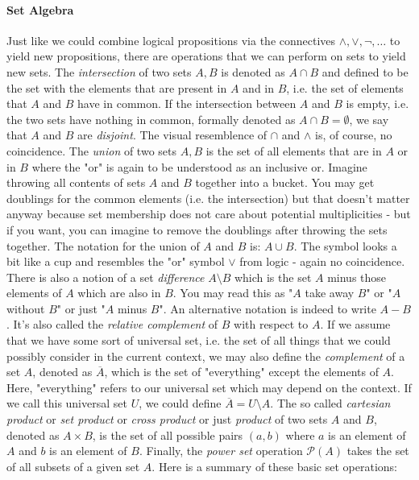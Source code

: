 \paragraph{Set Algebra} \label{Par:SetAlgebra} Just like we could combine logical propositions via the connectives $\wedge, \vee, \neg, \ldots$ to yield new propositions, there are operations that we can perform on sets to yield new sets. The \emph{intersection} of two sets $A, B$ is denoted as $A \cap B$ and defined to be the set with the elements that are present in $A$ and in $B$, i.e. the set of elements that $A$ and $B$ have in common. If the intersection between $A$ and $B$ is empty, i.e. the two sets have nothing in common, formally denoted as $A \cap B = \emptyset$, we say that $A$ and $B$ are \emph{disjoint}. The visual resemblence of $\cap$ and $\wedge$ is, of course, no coincidence. The \emph{union} of two sets $A,B$ is the set of all elements that are in $A$ or in $B$ where the "or" is again to be understood as an inclusive or. Imagine throwing all contents of sets $A$ and $B$ together into a bucket. You may get doublings for the common elements (i.e. the intersection) but that doesn't matter anyway because set membership does not care about potential multiplicities - but if you want, you can imagine to remove the doublings after throwing the sets together. The notation for the union of $A$ and $B$ is: $A \cup B$. The symbol looks a bit like a cup and resembles the "or" symbol $\vee$ from logic - again no coincidence. There is also a notion of a set \emph{difference} $A \setminus B$ which is the set $A$ minus those elements of $A$ which are also in $B$. You may read this as "$A$ take away $B$" or "$A$ without $B$" or just "$A$ minus $B$". An alternative notation is indeed to write $A - B$. It's also called the \emph{relative complement} of $B$ with respect to $A$. If we assume that we have some sort of universal set, i.e. the set of all things that we could possibly consider in the current context, we may also define the \emph{complement} of a set $A$, denoted as $\overline{A}$, which is the set of "everything" except the elements of $A$. Here, "everything" refers to our universal set which may depend on the context. If we call this universal set $U$, we could define $\overline{A} = U \setminus A$. The so called \emph{cartesian product} or \emph{set product} or \emph{cross product} or just \emph{product} of two sets $A$ and $B$, denoted as $A \times B$, is the set of all possible pairs $(a,b)$ where $a$ is an element of $A$ and $b$ is an element of $B$. Finally, the \emph{power set} operation $\mathcal{P}(A)$ takes the set of all subsets of a given set $A$. Here is a summary of these basic set operations:
